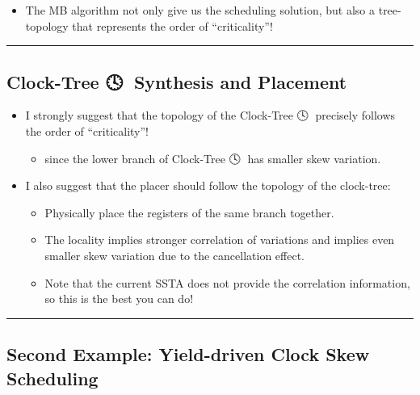 \documentclass[
]{article}
\providecommand{\tightlist}{%
  \setlength{\itemsep}{0pt}\setlength{\parskip}{0pt}}
\begin{document}
\begin{itemize}
\tightlist
\item
  The MB algorithm not only give us the scheduling solution, but also
  a tree-topology that represents the order of ``criticality''!
\end{itemize}

\begin{figure}
\centering

\end{figure}

\begin{center}\rule{0.5\linewidth}{0.5pt}\end{center}

\subsection{Clock-Tree 🕓🌳 Synthesis and Placement}\label{clock-tree-synthesis-and-placement}

\begin{itemize}
\tightlist
\item
  I strongly suggest that the topology of the Clock-Tree 🕓🌳 precisely
  follows the order of ``criticality''!

  \begin{itemize}
  \tightlist
  \item
    since the lower branch of Clock-Tree 🕓🌳 has smaller skew variation.
  \end{itemize}
\item
  I also suggest that the placer should follow the topology of the
  clock-tree:

  \begin{itemize}
  \tightlist
  \item
    Physically place the registers of the same branch together.
  \item
    The locality implies stronger correlation of variations and
    implies even smaller skew variation due to the cancellation
    effect.
  \item
    Note that the current SSTA does not provide the correlation
    information, so this is the best you can do!
  \end{itemize}
\end{itemize}

\begin{center}\rule{0.5\linewidth}{0.5pt}\end{center}

\subsection{Second Example: Yield-driven Clock Skew Scheduling}\label{second-example-yield-driven-clock-skew-scheduling}
\end{document}
